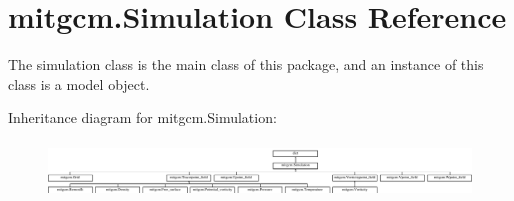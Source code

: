 \hypertarget{classmitgcm_1_1Simulation}{\section{mitgcm.\+Simulation Class Reference}
\label{classmitgcm_1_1Simulation}
}


The simulation class is the main class of this package, and an instance of this class is a model object.  


Inheritance diagram for mitgcm.\+Simulation\+:\begin{figure}[H]
\begin{center}
\leavevmode
\includegraphics[height=1.490353cm]{classmitgcm_1_1Simulation}
\end{center}
\end{figure}
